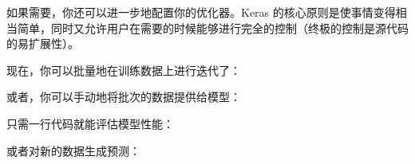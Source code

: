 如果需要，你还可以进一步地配置你的优化器。Keras
的核心原则是使事情变得相当简单，同时又允许用户在需要的时候能够进行完全的控制（终极的控制是源代码的易扩展性）。

\begin{Shaded}
\begin{Highlighting}[]
\OperatorTok{=}
              \OperatorTok{=}\OperatorTok{=}\OperatorTok{=}\OperatorTok{=}\NormalTok{))}
\end{Highlighting}
\end{Shaded}

现在，你可以批量地在训练数据上进行迭代了：

\begin{Shaded}
\begin{Highlighting}[]
\OperatorTok{=}\OperatorTok{=}\NormalTok{)}
\end{Highlighting}
\end{Shaded}

或者，你可以手动地将批次的数据提供给模型：

\begin{Shaded}
\begin{Highlighting}[]
\end{Highlighting}
\end{Shaded}

只需一行代码就能评估模型性能：

\begin{Shaded}
\begin{Highlighting}[]
\OperatorTok{=} \OperatorTok{=}\NormalTok{)}
\end{Highlighting}
\end{Shaded}

或者对新的数据生成预测：

\begin{Shaded}
\begin{Highlighting}[]
\OperatorTok{=} \OperatorTok{=}\NormalTok{)}
\end{Highlighting}
\end{Shaded}

